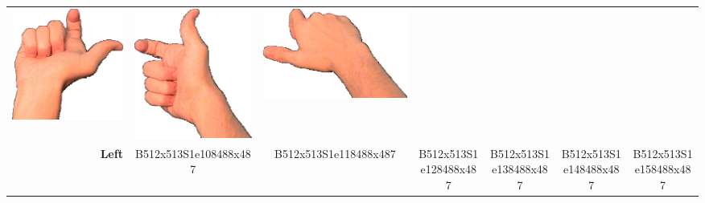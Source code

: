 \documentclass{article}
\begin{document}
\begin{center}
\begin{tabular}{r*{6}{c}}
\includegraphics[scale=0.1]{images/09-05-4.jpg}&
\includegraphics[scale=0.1]{images/09-05-5.jpg}&
\includegraphics[scale=0.1]{images/09-05-6.jpg}\\
\textbf{Left}&
B512x513S1e108488x487&
B512x513S1e118488x487&
B512x513S1e128488x487&
B512x513S1e138488x487&
B512x513S1e148488x487&
B512x513S1e158488x487\\
\end{tabular}
\end{center}
\end{document}
